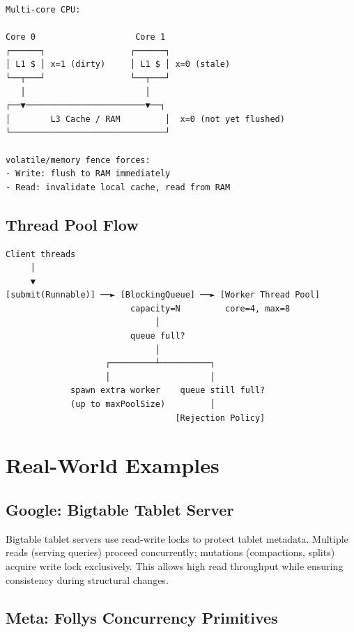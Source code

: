 \documentclass[11pt]{article}
\begin{document}
\setcodelang{}

\begin{verbatim}
Multi-core CPU:

Core 0                    Core 1
┌──────┐                 ┌──────┐
│ L1 $ │ x=1 (dirty)     │ L1 $ │ x=0 (stale)
└──┬───┘                 └──┬───┘
   │                        │
┌──▼────────────────────────▼──┐
│        L3 Cache / RAM         │  x=0 (not yet flushed)
└───────────────────────────────┘

volatile/memory fence forces:
- Write: flush to RAM immediately
- Read: invalidate local cache, read from RAM
\end{verbatim}

\subsection{Thread Pool Flow}\label{thread-pool-flow}

\setcodelang{}

\begin{verbatim}
Client threads
     │
     ▼
[submit(Runnable)] ──► [BlockingQueue] ──► [Worker Thread Pool]
                         capacity=N         core=4, max=8
                              │
                         queue full?
                              │
                    ┌─────────┴──────────┐
                    │                    │
             spawn extra worker    queue still full?
             (up to maxPoolSize)         │
                                  [Rejection Policy]
\end{verbatim}

\section{Real-World Examples}\label{real-world-examples}

\subsection{Google: Bigtable Tablet Server}\label{google-bigtable-tablet-server}

Bigtable tablet servers use read-write locks to protect tablet metadata. Multiple reads (serving queries) proceed concurrently; mutations (compactions, splits) acquire write lock exclusively. This allows high read throughput while ensuring consistency during structural changes.

\subsection{Meta: Folly\textquotesingle s Concurrency Primitives}\label{meta-follys-concurrency-primitives}
\end{document}
